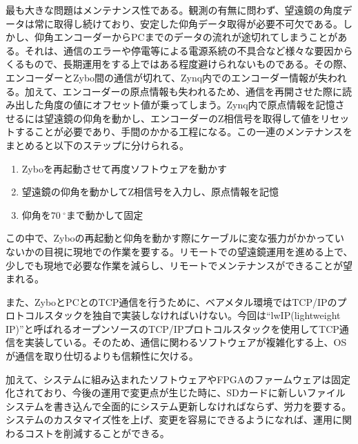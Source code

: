 最も大きな問題はメンテナンス性である。観測の有無に問わず、望遠鏡の角度データは常に取得し続けており、安定した仰角データ取得が必要不可欠である。しかし、仰角エンコーダーからPCまでのデータの流れが途切れてしまうことがある。それは、通信のエラーや停電等による電源系統の不具合など様々な要因からくるもので、長期運用をする上ではある程度避けられないものである。その際、エンコーダーとZybo間の通信が切れて、Zynq内でのエンコーダー情報が失われる。加えて、エンコーダーの原点情報も失われるため、通信を再開させた際に読み出した角度の値にオフセット値が乗ってしまう。Zynq内で原点情報を記憶させるには望遠鏡の仰角を動かし、エンコーダーのZ相信号を取得して値をリセットすることが必要であり、手間のかかる工程になる。この一連のメンテナンスをまとめると以下のステップに分けられる。
\begin{enumerate}
  \item Zyboを再起動させて再度ソフトウェアを動かす
  \item 望遠鏡の仰角を動かしてZ相信号を入力し、原点情報を記憶
  \item 仰角を$\SI{70}{^{\circ}}$まで動かして固定
\end{enumerate}

この中で、Zyboの再起動と仰角を動かす際にケーブルに変な張力がかかっていないかの目視に現地での作業を要する。リモートでの望遠鏡運用を進める上で、少しでも現地で必要な作業を減らし、リモートでメンテナンスができることが望まれる。

また、ZyboとPCとのTCP通信を行うために、ベアメタル環境ではTCP/IPのプロトコルスタックを独自で実装しなければいけない。今回は``lwIP(lightweight IP)''と呼ばれるオープンソースのTCP/IPプロトコルスタックを使用してTCP通信を実装している。そのため、通信に関わるソフトウェアが複雑化する上、OSが通信を取り仕切るよりも信頼性に欠ける。

加えて、システムに組み込まれたソフトウェアやFPGAのファームウェアは固定化されており、今後の運用で変更点が生じた時に、SDカードに新しいファイルシステムを書き込んで全面的にシステム更新しなければならず、労力を要する。システムのカスタマイズ性を上げ、変更を容易にできるようになれば、運用に関わるコストを削減することができる。

